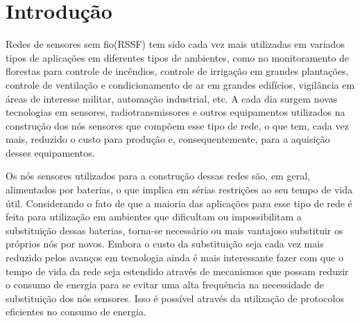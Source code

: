 \section{Introdução}

Redes de sensores sem fio(RSSF) tem sido cada vez mais utilizadas em variados tipos de aplicações em diferentes tipos de ambientes, como no monitoramento de florestas para controle de incêndios, controle de irrigação em grandes plantações, controle de ventilação e condicionamento de ar em grandes edifícios, vigilância em áreas de interesse militar, automação industrial, etc. A cada dia surgem novas tecnologias em sensores, radiotransmissores e outros equipamentos utilizados na construção dos nós sensores que compõem esse tipo de rede, o que tem, cada vez mais, reduzido o custo para produção e, consequentemente, para a aquisição desses equipamentos.

Os nós sensores utilizados para a construção dessas redes são, em geral, alimentados por baterias, o que implica em sérias restrições ao seu tempo de vida útil. Considerando o fato de que a maioria das aplicações para esse tipo de rede é feita para utilização em ambientes que dificultam ou impossibilitam a substituição dessas baterias, torna-se necessário ou mais vantajoso substituir os próprios nós por novos. Embora o custo da substituição seja cada vez mais reduzido pelos avanços em tecnologia ainda é mais interessante fazer com que o tempo de vida da rede seja estendido através de mecanismos que possam reduzir o consumo de energia para se evitar uma alta frequência na necessidade de substituição dos nós sensores. Isso é possível através da utilização de protocolos eficientes no consumo de energia. 


